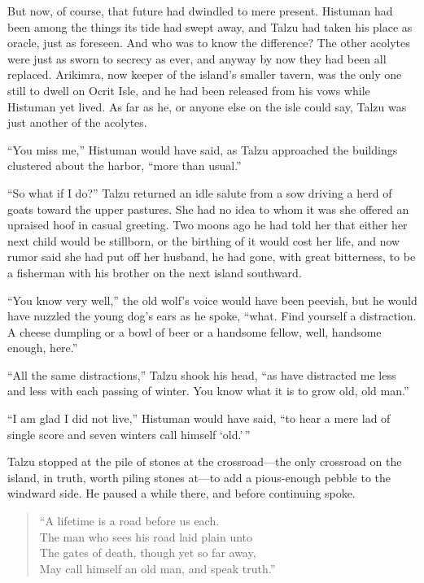 \secdiv

\noindent But now, of course, that future had dwindled to mere present. Histuman had been among the things its tide had swept away, and Talzu had taken his place as oracle, just as foreseen. And who was to know the difference? The other acolytes were just as sworn to secrecy as ever, and anyway by now they had been all replaced. Arikimra, now keeper of the island's smaller tavern, was the only one still to dwell on Ocrit Isle, and he had been released from his vows while Histuman yet lived. As far as he, or anyone else on the isle could say, Talzu was just another of the acolytes.

``You miss me,'' Histuman would have said, as Talzu approached the buildings clustered about the harbor, ``more than usual.''

``So what if I do?'' Talzu returned an idle salute from a sow driving a herd of goats toward the upper pastures. She had no idea to whom it was she offered an upraised hoof in casual greeting. Two moons ago he had told her that either her next child would be stillborn, or the birthing of it would cost her life, and now rumor said she had put off her husband, he had gone, with great bitterness, to be a fisherman with his brother on the next island southward.

``You know very well,'' the old wolf's voice would have been peevish, but he would have nuzzled the young dog's ears as he spoke, ``what. Find yourself a distraction. A cheese dumpling or a bowl of beer or a handsome fellow, well, handsome enough, here.''

``All the same distractions,'' Talzu shook his head, ``as have distracted me less and less with each passing of winter. You know what it is to grow old, old man.''

``I am glad I did not live,'' Histuman would have said, ``to hear a mere lad of single score and seven winters call himself `old.'\,''

Talzu stopped at the pile of stones at the crossroad---the only crossroad on the island, in truth, worth piling stones at---to add a pious-enough pebble to the windward side. He paused a while there, and before continuing spoke.

\begin{verse}
``A lifetime is a road before us each. \\
The man who sees his road laid plain unto \\
The gates of death, though yet so far away, \\
May call himself an old man, and speak truth.''
\end{verse}

